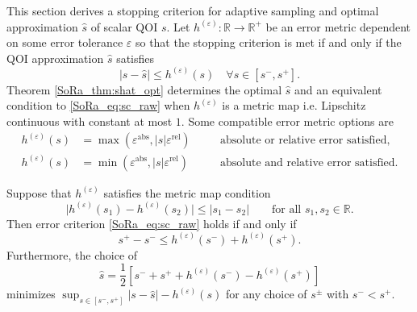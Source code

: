 \documentclass[graybox]{svmult}
\begin{document}
This section derives a stopping criterion for adaptive sampling and optimal approximation $\hat{s}$ of scalar QOI $s$. Let $h^{(\varepsilon)}: \mathbb{R} \to \mathbb{R}^+$ be an error metric dependent on some error tolerance $\varepsilon$ so that the stopping criterion is met if and only if the QOI approximation $\hat{s}$ satisfies 
\begin{equation}
    \lvert s-\hat{s} \rvert \leq h^{(\varepsilon)}(s) \quad \forall s \in [s^-,s^+].
    \label{SoRa_eq:sc_raw}
\end{equation}
Theorem \ref{SoRa_thm:shat_opt} determines the optimal $\hat{s}$ and an equivalent condition to \eqref{SoRa_eq:sc_raw} when $h^{(\varepsilon)}$ is a metric map i.e. Lipschitz continuous with constant at most $1$. Some compatible error metric options are
\begin{subequations}
\begin{align}
    h^{(\varepsilon)}(s) &= \max\left(\varepsilon^\text{abs},\lvert s \rvert \varepsilon^\text{rel} \right) \quad &&\text{absolute or relative error satisfied,} \label{SoRa_eq:h_abs_or_rel} \\
    h^{(\varepsilon)}(s) &= \min\left(\varepsilon^\text{abs},\lvert s \rvert \varepsilon^\text{rel} \right) \quad &&\text{absolute and relative error satisfied.} \label{SoRa_eq:h_abs_and_rel}
\end{align}
\end{subequations}
\begin{theorem} \label{SoRa_thm:shat_opt}
    Suppose that  $h^{(\varepsilon)}$ satisfies the metric map condition
    \begin{equation}
        \lvert h^{(\varepsilon)}(s_1) - h^{(\varepsilon)}(s_2) \rvert \leq \lvert s_1 - s_2 \rvert \qquad \text{for all } s_1,s_2 \in \mathbb{R}.
        \label{SoRa_eq:metric_map_cond}
    \end{equation}
    Then error criterion  \eqref{SoRa_eq:sc_raw} holds if and only if 
    \begin{equation}
        s^+-s^- \leq h^{(\varepsilon)}(s^-)+h^{(\varepsilon)}(s^+).
        \label{SoRa_eq:sc}
    \end{equation}
    Furthermore, the choice of 
    \begin{equation}
        \hat{s} = \frac{1}{2}\left[s^-+s^++h^{(\varepsilon)}(s^-)-h^{(\varepsilon)}(s^+)\right]
        \label{SoRa_eq:shat_opt}
    \end{equation}
    minimizes $\sup_{s \in [s^-,s^+]} \lvert s - \hat{s} \rvert -h^{(\varepsilon)}(s)$ for any choice of $s^{\pm}$ with $s^- < s^+$.
\end{theorem}
\end{document}
